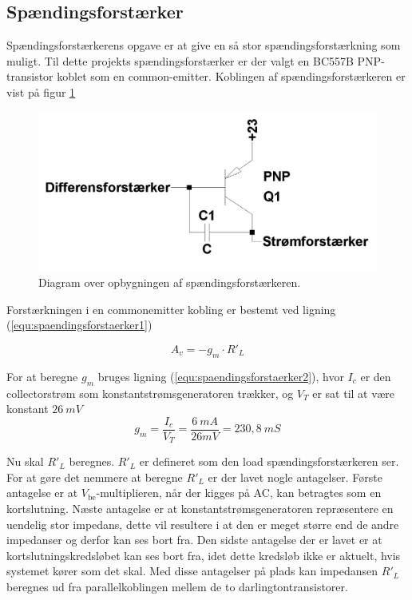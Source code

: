 \subsection{Spændingsforstærker}
\label{effekt_spaendingsforstaerker}
Spændingsforstærkerens opgave er at give en så stor spændingsforstærkning som muligt. Til dette projekts spændingsforstærker er der valgt en BC557B PNP-transistor koblet som en common-emitter. Koblingen af spændingsforstærkeren er vist på figur \ref{spaendingsforstaerker_diagram}

\begin{figure}[h]
\centering
\includegraphics[scale=0.2]{teknisk/effektforstaerker/spaendingsforstaerker_diagram.png}
\caption{Diagram over opbygningen af spændingsforstærkeren.}
\label{spaendingsforstaerker_diagram}
\end{figure}

Forstærkningen i en commonemitter kobling er bestemt ved ligning (\ref{equ:spaendingsforstaerker1}) \cite{ael-mm7}%

\begin{equation}
\label{equ:spaendingsforstaerker1}
A_v = -g_m \cdot R'_L
\end{equation}

For at beregne $g_m$ bruges ligning (\ref{equ:spaendingsforstaerker2}), hvor $I_c$ er den collectorstrøm som konstantstrømsgeneratoren trækker, og $V_T$ er sat til at være konstant $26~mV$
\begin{equation}
\label{equ:spaendingsforstaerker2}
g_m = \frac{I_c}{V_T} = \frac{6~mA}{26mV} = 230,8~mS
\end{equation}

Nu skal $R'_L$ beregnes. $R'_L$ er defineret som den load spændingsforstærkeren ser. For at gøre det nemmere at beregne $R'_L$ er der lavet nogle antagelser. Første antagelse er at $V_\mathrm{be}$-multiplieren, når der kigges på AC, kan betragtes som en kortslutning. Næste antagelse er at konstantstrømsgeneratoren repræsentere en uendelig stor impedans, dette vil resultere i at den er meget større end de andre impedanser og derfor kan ses bort fra. Den sidste antagelse der er lavet er at kortslutningskredsløbet kan ses bort fra, idet dette kredsløb ikke er aktuelt, hvis systemet  kører som det skal. Med disse antagelser på plads kan impedansen $R'_L$ beregnes ud fra parallelkoblingen mellem de to darlingtontransistorer.

